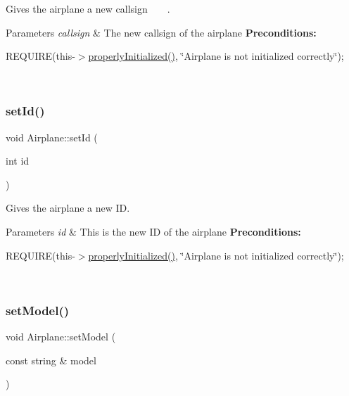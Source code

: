 Gives the airplane a new callsign ~\newline
 ~\newline
. 


\begin{DoxyParams}{Parameters}
{\em callsign} & The new callsign of the airplane {\bfseries Preconditions\+:}
\begin{DoxyItemize}
\item R\+E\+Q\+U\+I\+RE(this-\/$>$\mbox{\hyperlink{class_airplane_a6f80df8f692cc8d67d292c1e9f26d59e}{properly\+Initialized()}}, \char`\"{}\+Airplane is not initialized correctly\char`\"{}); 
\end{DoxyItemize}\\
\hline
\end{DoxyParams}
\mbox{\label{class_airplane_ac71484f422e952d4cfe94d89b302dbc4}} 
\subsubsection{\texorpdfstring{set\+Id()}{setId()}}
{\footnotesize\ttfamily void Airplane\+::set\+Id (\begin{DoxyParamCaption}\item[{int}]{id }\end{DoxyParamCaption})}



Gives the airplane a new ID. 


\begin{DoxyParams}{Parameters}
{\em id} & This is the new ID of the airplane {\bfseries Preconditions\+:}
\begin{DoxyItemize}
\item R\+E\+Q\+U\+I\+RE(this-\/$>$\mbox{\hyperlink{class_airplane_a6f80df8f692cc8d67d292c1e9f26d59e}{properly\+Initialized()}}, \char`\"{}\+Airplane is not initialized correctly\char`\"{}); 
\end{DoxyItemize}\\
\hline
\end{DoxyParams}
\mbox{\label{class_airplane_aaeb19ae361b046ce543ad687aea63123}} 
\subsubsection{\texorpdfstring{set\+Model()}{setModel()}}
{\footnotesize\ttfamily void Airplane\+::set\+Model (\begin{DoxyParamCaption}\item[{const string \&}]{model }\end{DoxyParamCaption})}




